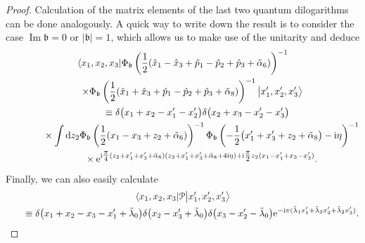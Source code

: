 \documentclass[pdftex]{sigma}
\newcommand{\bb}{{\mathfrak b}}
\newcommand{\e}{{\mathrm e}}
\numberwithin{equation}{section}
\begin{document}
\begin{proof}
 Calculation of the matrix elements of the last two quantum
 dilogarithms can be done analogously. A quick way to write down the
 result is to consider the case $\operatorname{Im} \bb = 0$ or
 $|\bb| = 1$, which allows us to make use of the unitarity
\smash{$\overline{\Phi_{\bb}(z)} = \Phi_{\bb}(\bar{z})^{-1}
$}
 and deduce
 \begin{gather*}
\langle x_1,x_2,x_3|
 \Phi_\bb\left(\frac{1}{2}(\hat{x}_1 - \hat{x}_3 + \hat{p}_1 - \hat{p}_2 + \hat{p}_3 +\tilde{\alpha}_6)\right)^{-1}\\
 \qquad\times
\Phi_\bb\left(\frac{1}{2}(\hat{x}_1 + \hat{x}_3 + \hat{p}_1 - \hat{p}_2 + \hat{p}_3 +\tilde{\alpha}_8)\right)^{-1}
\bigl|x'_1,x'_2,x'_3\bigr\rangle
\\
\phantom{ \qquad\times}{}\equiv \delta\bigl(x_1 + x_2 -x'_1 - x'_2\bigr) \delta\bigl(x_2 + x_3 -x'_2 - x'_3\bigr)
\\
\phantom{ \qquad\times\equiv}{} \times \int{\rm d}z_2 \Phi_\bb\left(\frac{1}{2}(x_1-x_3+z_2+{\tilde{\alpha}_6})\right)^{-1}
\Phi_\bb\left(-\frac{1}{2}\bigl(x'_1+x'_3+z_2+\tilde{\alpha}_8\bigr)-{\rm i}\eta\right)^{-1}
\\
\phantom{ \qquad\times\equiv}{} \times \e^{{\rm i}\tfrac{\pi}{4}(z_2+x'_1+x'_3+\tilde{\alpha}_8)(z_2+x'_1+x'_3+\tilde{\alpha}_8+4{\rm i} \eta)
+{\rm i} \tfrac{\pi}{2}z_2(x_1-x'_1+x_3-x'_3)}.
 \end{gather*}
 Finally, we can also easily calculate
 \begin{gather*}
 \langle x_1, x_2, x_3|\mathcal{P}\bigl|x'_1, x'_2, x'_3 \bigr\rangle
 \\
\qquad \equiv
 \delta\bigl(x_1+x_2-x_3-x'_1+\tilde{\lambda}_{0}\bigr)
 \delta\bigl(x_2-x'_3+\tilde{\lambda}_{0}\bigr)
 \delta\bigl(x_3-x'_2-\tilde{\lambda}_{0}\bigr)
 \e^{-{\rm i}\pi(\tilde{\lambda}_{1}x'_1+\tilde{\lambda}_{3}x'_2+\tilde{\lambda}_{2}x'_3)}.
 \end{gather*}



\end{proof}
\end{document}
